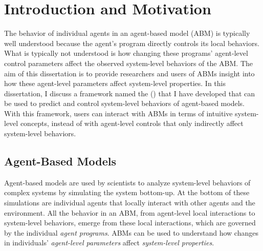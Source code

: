\chapter{Introduction and Motivation}
\thispagestyle{plain}

\label{Introduction and Motivation}

The behavior of individual agents in an agent-based model (ABM) is typically well understood because the agent's program directly controls its local behaviors.
What is typically not understood is how changing these programs' agent-level control parameters affect the observed system-level behaviors of the ABM.
The aim of this dissertation is to provide researchers and users of ABMs insight into how these agent-level parameters affect system-level properties.
In this dissertation, I discuss a framework named the \framework (\fw) that I have developed that can be used to predict and control system-level behaviors of agent-based models.
With this framework, users can interact with ABMs in terms of intuitive system-level concepts, instead of with agent-level controls that only indirectly affect system-level behaviors.


\section{Agent-Based Models}



Agent-based models are used by scientists to analyze system-level behaviors of complex systems by simulating the system bottom-up.
At the bottom of these simulations are individual agents that locally interact with other agents and the environment.
All the behavior in an ABM, from agent-level local interactions to system-level behaviors, emerge from these local interactions, which are governed by the individual \textit{agent programs}.
ABMs can be used to understand how changes in individuals' \textit{agent-level parameters} affect \textit{system-level properties}.


